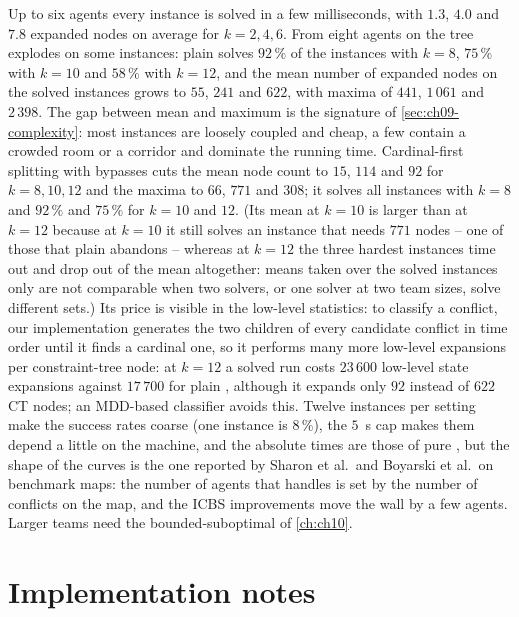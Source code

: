 Up to six agents every instance is solved in a few milliseconds, with
$1.3$, $4.0$ and $7.8$ expanded nodes on average for $k = 2, 4, 6$. From
eight agents on the tree explodes on some instances: plain \cbs solves
$92\,\%$ of the instances with $k = 8$, $75\,\%$ with $k = 10$ and $58\,\%$
with $k = 12$, and the mean number of expanded nodes on the solved instances
grows to $55$, $241$ and $622$, with maxima of $441$, $1\,061$ and $2\,398$.
The gap between mean and maximum is the signature of \cref{sec:ch09-complexity}:
most instances are loosely coupled and cheap, a few contain a crowded room
or a corridor and dominate the running time. Cardinal-first splitting with
bypasses cuts the mean node count to $15$, $114$ and $92$ for $k = 8, 10,
12$ and the maxima to $66$, $771$ and $308$; it solves all instances with
$k = 8$ and $92\,\%$ and $75\,\%$ for $k = 10$ and $12$. (Its mean at
$k = 10$ is larger than at $k = 12$ because at $k = 10$ it still solves an
instance that needs $771$ nodes -- one of those that plain \cbs abandons --
whereas at $k = 12$ the three hardest instances time out and drop out of the
mean altogether: means taken over the solved instances only are not
comparable when two solvers, or one solver at two team sizes, solve
different sets.) Its price is
visible in the low-level statistics: to classify a conflict, our
implementation generates the two children of every candidate conflict in
time order until it finds a cardinal one, so it performs many more
low-level expansions per constraint-tree node: at $k = 12$ a solved run
costs $23\,600$ low-level state expansions against $17\,700$ for plain
\cbs, although it expands only $92$ instead of $622$ CT nodes; an MDD-based
classifier avoids this. Twelve instances per
setting make the success rates coarse (one instance is $8\,\%$), the
$5$~s cap makes them depend a little on the machine, and the
absolute times are those of pure \python, but the shape of the curves is
the one reported by Sharon et al.\ and Boyarski et al.\ on benchmark maps:
the number of agents that \cbs handles is set by the number of conflicts on
the map, and the ICBS improvements move the wall by a few agents. Larger
teams need the bounded-suboptimal \ecbs of \cref{ch:ch10}.

\section{Implementation notes}
\label{sec:ch09-implementation}

